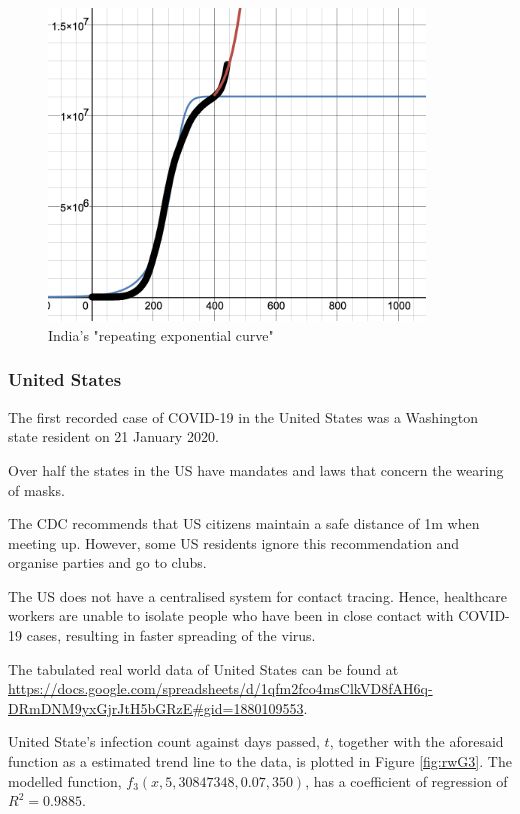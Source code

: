 \documentclass[a4paper,titlepage]{article}
\begin{document}
\begin{figure}[htbp]
    \centering
    \includegraphics[width=10cm]{indiaRepeat.png}
    \caption{India's "repeating exponential curve"}
    \label{fig:indiaRepeat}
\end{figure}

\subsubsection{United States}

The first recorded case of COVID-19  in the United States was a Washington state resident on 21 January 2020. 

Over half the states in the US have mandates and laws that concern the wearing of masks.

The CDC recommends that US citizens maintain a safe distance of 1m when meeting up. However, some US residents ignore this recommendation and organise parties and go to clubs.

The US does not have a centralised system for contact tracing. Hence, healthcare workers are unable to isolate people who have been in close contact with COVID-19 cases, resulting in faster spreading of the virus.

The tabulated real world data of United States can be found at \url{https://docs.google.com/spreadsheets/d/1qfm2fco4msClkVD8fAH6q-DRmDNM9yxGjrJtH5bGRzE#gid=1880109553}.

United State's infection count against days passed, $t$, together with the aforesaid function as a estimated trend line to the data, is plotted in Figure \ref{fig:rwG3}. The modelled function, $f_3(x,5,30847348,0.07,350)$, has a coefficient of regression of $R^2=0.9885$.
\end{document}
